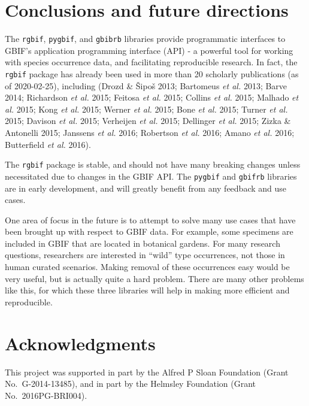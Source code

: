 \documentclass[3p]{elsarticle} %
\begin{document}
\hypertarget{conclusions-and-future-directions}{%
\section{Conclusions and future
directions}\label{conclusions-and-future-directions}}

The \texttt{rgbif}, \texttt{pygbif}, and \texttt{gbibrb} libraries
provide programmatic interfaces to GBIF's application programming
interface (API) - a powerful tool for working with species occurrence
data, and facilitating reproducible research. In fact, the
\texttt{rgbif} package has already been used in more than 20 scholarly
publications (as of 2020-02-25), including (Drozd \& Šipoš 2013;
Bartomeus \emph{et al.} 2013; Barve 2014; Richardson \emph{et al.} 2015;
Feitosa \emph{et al.} 2015; Collins \emph{et al.} 2015; Malhado \emph{et
al.} 2015; Kong \emph{et al.} 2015; Werner \emph{et al.} 2015; Bone
\emph{et al.} 2015; Turner \emph{et al.} 2015; Davison \emph{et al.}
2015; Verheijen \emph{et al.} 2015; Dellinger \emph{et al.} 2015; Zizka
\& Antonelli 2015; Janssens \emph{et al.} 2016; Robertson \emph{et al.}
2016; Amano \emph{et al.} 2016; Butterfield \emph{et al.} 2016).

The \texttt{rgbif} package is stable, and should not have many breaking
changes unless necessitated due to changes in the GBIF API. The
\texttt{pygbif} and \texttt{gbifrb} libraries are in early development,
and will greatly benefit from any feedback and use cases.

One area of focus in the future is to attempt to solve many use cases
that have been brought up with respect to GBIF data. For example, some
specimens are included in GBIF that are located in botanical gardens.
For many research questions, researchers are interested in ``wild'' type
occurrences, not those in human curated scenarios. Making removal of
these occurrences easy would be very useful, but is actually quite a
hard problem. There are many other problems like this, for which these
three libraries will help in making more efficient and reproducible.

\hypertarget{acknowledgments}{%
\section{Acknowledgments}\label{acknowledgments}}

This project was supported in part by the Alfred P Sloan Foundation
(Grant No.~G-2014-13485), and in part by the Helmsley Foundation (Grant
No.~2016PG-BRI004).
\end{document}
